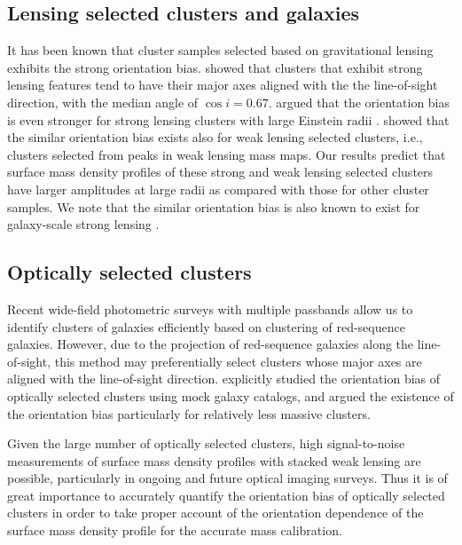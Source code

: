 \documentclass[a4paper,fleqn,usenatbib]{mnras}
\begin{document}
\subsection{Lensing selected clusters and galaxies}
It has been known that cluster samples selected based on gravitational
lensing exhibits the strong orientation bias. \citet{Hennawi2007}
showed that clusters that exhibit strong lensing features tend to have
their major axes aligned with the the line-of-sight direction, with
the median angle of $\cos i = 0.67$. \citet{Oguri2009} argued that the
orientation bias is even stronger for strong lensing clusters with
large Einstein radii \citep[see also][]{Meneghetti2010}.
\citet{Hamana2012} showed that the similar orientation bias exists
also for weak lensing selected clusters, i.e., clusters selected from
peaks in weak lensing mass maps. Our results predict that surface mass
density profiles of these strong and weak lensing selected clusters
have larger amplitudes at large radii as compared with those for other
cluster samples. We note that the similar orientation bias is also
known to exist for galaxy-scale strong lensing \citep{Rozo2007}.

\subsection{Optically selected clusters}
Recent wide-field photometric surveys with multiple passbands allow us
to identify clusters of galaxies efficiently based on clustering of
red-sequence galaxies. However, due to the projection of red-sequence
galaxies along the line-of-sight, this method may preferentially
select clusters whose major axes are aligned with the line-of-sight
direction. \citet{Dietrich2014} explicitly studied the orientation
bias of optically selected clusters using mock galaxy catalogs, and
argued the existence of the orientation bias particularly for
relatively less massive clusters.

Given the large number of optically selected clusters, high
signal-to-noise measurements of surface mass density profiles with
stacked weak lensing are possible, particularly in ongoing and future
optical imaging surveys. Thus it is of great importance to accurately
quantify the orientation bias of optically selected clusters in order
to take proper account of the orientation dependence of the surface
mass density profile for the accurate mass calibration.
\end{document}
